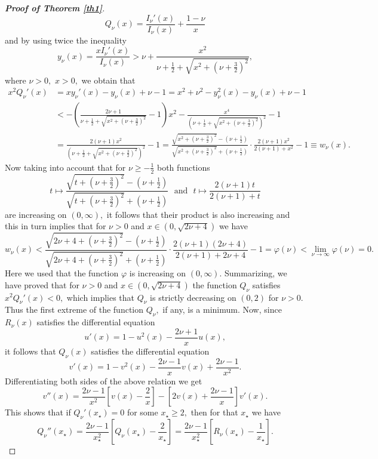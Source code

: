 \documentclass[10pt]{amsart}
\begin{document}
\begin{proof}[\bf Proof of Theorem \ref{th1}]
$$Q_{\nu}(x)=\frac{I_{\nu}'(x)}{I_{\nu}(x)}+\frac{1-\nu}{x}$$ and by using twice the inequality \cite[p. 526]{segura}
$$y_{\nu}(x)=\frac{xI_{\nu}'(x)}{I_{\nu}(x)}>\nu+\frac{x^2}{\nu+\frac{1}{2}+\sqrt{x^2+\left(\nu+\frac{3}{2}\right)^2}},$$
where $\nu>0,$ $x>0,$ we obtain that
\begin{align*}x^2Q_{\nu}'(x)&=xy_{\nu}'(x)-y_{\nu}(x)+\nu-1=x^2+\nu^2-y_{\nu}^2(x)-y_{\nu}(x)+\nu-1\\&<
-\left(\frac{2\nu+1}{\nu+\frac{1}{2}+\sqrt{x^2+\left(\nu+\frac{3}{2}\right)^2}}-1\right)x^2-
\frac{x^4}{\left(\nu+\frac{1}{2}+\sqrt{x^2+\left(\nu+\frac{3}{2}\right)^2}\right)^2}-1\\
&=\frac{2(\nu+1)x^2}{\left(\nu+\frac{1}{2}+\sqrt{x^2+\left(\nu+\frac{3}{2}\right)^2}\right)^2}-1=
\frac{\sqrt{x^2+\left(\nu+\frac{3}{2}\right)^2}-\left(\nu+\frac{1}{2}\right)}{\sqrt{x^2+\left(\nu+\frac{3}{2}\right)^2}+\left(\nu+\frac{1}{2}\right)}
\cdot\frac{2(\nu+1)x^2}{2(\nu+1)+x^2}-1\equiv w_{\nu}(x).
\end{align*}
Now taking into account that for $\nu\geq-\frac{1}{2}$ both functions
$$t\mapsto \frac{\sqrt{t+\left(\nu+\frac{3}{2}\right)^2}-\left(\nu+\frac{1}{2}\right)}{\sqrt{t+\left(\nu+\frac{3}{2}\right)^2}+\left(\nu+\frac{1}{2}\right)}\ \ \ \mbox{and}\ \ \ t\mapsto \frac{2(\nu+1)t}{2(\nu+1)+t}$$
are increasing on $(0,\infty),$ it follows that their product is also increasing and this in turn implies that for $\nu>0$ and $x\in(0,\sqrt{2\nu+4})$ we have
$$w_{\nu}(x)<\frac{\sqrt{2\nu+4+\left(\nu+\frac{3}{2}\right)^2}-\left(\nu+\frac{1}{2}\right)}{\sqrt{2\nu+4+\left(\nu+\frac{3}{2}\right)^2}
+\left(\nu+\frac{1}{2}\right)}\cdot\frac{2(\nu+1)(2\nu+4)}{2(\nu+1)+2\nu+4}-1=\varphi(\nu)<\lim_{\nu\to\infty}\varphi(\nu)=0.$$
Here we used that the function $\varphi$ is increasing on $(0,\infty).$ Summarizing, we have proved that for $\nu>0$ and $x\in(0,\sqrt{2\nu+4})$ the function $Q_{\nu}$ satisfies $x^2Q_{\nu}'(x)<0,$ which implies that $Q_{\nu}$ is strictly decreasing on $(0,2)$ for $\nu>0.$ Thus the first extreme of the function $Q_{\nu},$ if any, is a minimum. Now, since $R_{\nu}(x)$ satisfies the differential equation
$$u'(x)=1-u^2(x)-\frac{2\nu+1}{x}u(x),$$ it follows that $Q_{\nu}(x)$ satisfies the differential equation
$$v'(x)=1-v^2(x)-\frac{2\nu-1}{x}v(x)+\frac{2\nu-1}{x^2}.$$ Differentiating both sides of the above relation we get
$$v''(x)=\frac{2\nu-1}{x^2}\left[v(x)-\frac{2}{x}\right]-\left[2v(x)+\frac{2\nu-1}{x}\right]v'(x).$$
This shows that if $Q_{\nu}'(x_{\star})=0$ for some $x_{\star}\geq2,$ then for that $x_{\star}$ we have
$$Q_{\nu}''(x_{\star})=\frac{2\nu-1}{x_{\star}^2}\left[Q_{\nu}(x_{\star})-\frac{2}{x_{\star}}\right]=\frac{2\nu-1}{x_{\star}^2}\left[R_{\nu}(x_{\star})-\frac{1}{x_{\star}}\right].$$

\end{proof}
\end{document}
